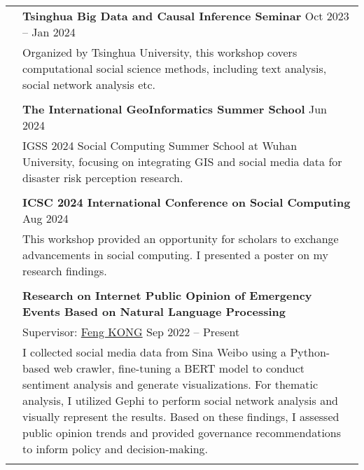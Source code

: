 \documentclass[letterpaper, 11pt]{article}
\begin{document}
\begin{longtable}{p{1.3in}p{4.8in}}
\color{RoyalBlue}{Workshop}
& \textbf{Tsinghua Big Data and Causal Inference Seminar } \hfill Oct 2023 -- Jan 2024 \\
& Organized by Tsinghua University, this workshop covers computational social science methods, including text analysis, social network analysis etc.\\
& \\
& \textbf{The International GeoInformatics Summer School} \hfill Jun 2024 \\
& IGSS 2024 Social Computing Summer School at Wuhan University, focusing on integrating GIS and social media data for disaster risk perception research.\\
& \\
& \textbf{ICSC 2024 International Conference on Social Computing} \hfill Aug 2024 \\
& This workshop provided an opportunity for scholars to exchange advancements in social computing. I presented a poster on my research findings.\\
& \\


\nohyphens{\color{RoyalBlue}{Research Experience}} 
& \textbf{Research on Internet Public Opinion of Emergency Events Based on Natural Language Processing} \\
& Supervisor: \href{https://cohd.cau.edu.cn/art/2020/11/27/art_48059_998984.html}{Feng KONG}  \hfill Sep 2022 -- Present \\
& I collected social media data from Sina Weibo using a Python-based web crawler, fine-tuning a BERT model to conduct sentiment analysis and generate visualizations. For thematic analysis, I utilized Gephi to perform social network analysis and visually represent the results. Based on these findings, I assessed public opinion trends and provided governance recommendations to inform policy and decision-making. \\
& \\


\end{longtable}
\end{document}
